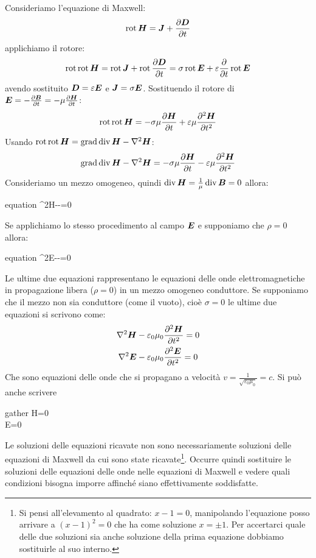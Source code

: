 Consideriamo l'equazione di Maxwell:
\[
  \operatorname{rot}\boldsymbol{H}=\boldsymbol{J}+\frac{\partial\boldsymbol{D}}{\partial t}
\]
applichiamo il rotore:
\[
  \operatorname{rot}\operatorname{rot} \boldsymbol{H}=\operatorname{rot} \boldsymbol{J}+\operatorname{rot}\frac{\partial\boldsymbol{D}}{\partial t}=\sigma\operatorname{rot}\boldsymbol{E}+\varepsilon\frac{\partial}{\partial t}\operatorname{rot}\boldsymbol{E}
\]
avendo sostituito $\boldsymbol{D}=\varepsilon\boldsymbol{E}$ e $\boldsymbol{J}=\sigma \boldsymbol{E}$. Sostituendo il rotore di $\boldsymbol{E}=-\frac{\partial\boldsymbol{B}}{\partial t}=-\mu\frac{\partial\boldsymbol{H}}{\partial t}$:
\[
  \operatorname{rot}\operatorname{rot} \boldsymbol{H}=-\sigma\mu\frac{\partial\boldsymbol{H}}{\partial t}+\varepsilon\mu\frac{\partial^2\boldsymbol{H}}{\partial t^2}
\]
Usando $\operatorname{rot}\operatorname{rot}\boldsymbol{H}=\operatorname{grad}\operatorname{div}\boldsymbol{H}-\nabla^2\boldsymbol{H}$:
\begin{equation}
  \operatorname{grad}\operatorname{div}\boldsymbol{H}-\nabla^2\boldsymbol{H}=-\sigma\mu\frac{\partial\boldsymbol{H}}{\partial t}-\varepsilon\mu\frac{\partial^2\boldsymbol{H}}{\partial t^2}
\end{equation}
Consideriamo un mezzo omogeneo, quindi $\operatorname{div}\boldsymbol{H}=\frac{1}{\mu}\operatorname{div}\boldsymbol{B}=0$ allora:
\begin{eqimp}{equation}
  \nabla^2\ve H-\varepsilon\mu{}-\sigma\mu{}=0
\end{eqimp}
Se applichiamo lo stesso procedimento al campo $\boldsymbol{E}$ e supponiamo che $\rho=0$ allora:
\begin{eqimp}{equation}
  \nabla^2\ve E-\varepsilon\mu{}-\sigma\mu{}=0
\end{eqimp}
Le ultime due equazioni rappresentano le equazioni delle onde elettromagnetiche in propagazione libera ($\rho=0$) in un mezzo omogeneo conduttore. Se supponiamo che il mezzo non sia conduttore (come il vuoto), cioè $\sigma=0$ le ultime due equazioni si scrivono come:
\begin{gather}
  \nabla^2\boldsymbol{H}-\varepsilon_0\mu_0\frac{\partial^2\boldsymbol{H}}{\partial t^2}=0\\
  \nabla^2\boldsymbol{E}-\varepsilon_0\mu_0\frac{\partial^2\boldsymbol{E}}{\partial t^2}=0
\end{gather}
Che sono equazioni delle onde che si propagano a velocità $v=\frac{1}{\sqrt{\varepsilon_0\mu_0}}=c$.
Si può anche scrivere
\begin{eqimp}{gather}
  \Box\ve H=0\\
  \Box\ve E=0
\end{eqimp}



Le soluzioni delle equazioni ricavate non sono necessariamente soluzioni delle equazioni di Maxwell da cui sono state ricavate\footnote{Si pensi all'elevamento al quadrato: $x-1=0$, manipolando l'equazione posso arrivare a $(x-1)^2=0$ che ha come soluzione $x=\pm 1$. Per accertarci quale delle due soluzioni sia anche soluzione della prima equazione dobbiamo sostituirle al suo interno.}. Occurre quindi sostituire le soluzioni delle equazioni delle onde nelle equazioni di Maxwell e vedere quali condizioni bisogna imporre affinché siano effettivamente soddisfatte.

